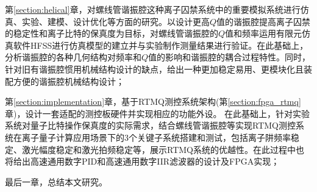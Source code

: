 第\ref{section:helical}章，对螺线管谐振腔这种离子囚禁系统中的重要模拟系统进行仿真、实验、建模、设计优化等方面的研究。以设计更高$Q$值的谐振腔提高离子囚禁的稳定性和离子比特的保真度为目标，对螺线管谐振腔的$Q$值和频率运用有限元仿真软件HFSS进行仿真模型的建立并与实验制作测量结果进行验证。在此基础上，分析谐振腔的各种几何结构对频率和$Q$值的影响和谐振腔的耦合过程特性。同时，针对旧有谐振腔惯用机械结构设计的缺点，给出一种更加稳定易用、更模块化且装配方便的谐振腔机械结构设计；

第\ref{section:implementation}章，基于RTMQ测控系统架构(第\ref{section:fpga_rtmq}章)，设计一套适配的测控板硬件并实现相应的功能外设。
在此基础上，针对实验系统对量子比特操作保真度的实际需求，结合螺线管谐振腔等实现RTMQ测控系统在离子量子计算应用场景下的3个关键子系统搭建和测试，包括离子阱频率稳定、激光幅度稳定和激光拍频稳定等，展示RTMQ系统的优越性。在此过程中也将给出高速通用数字PID和高速通用数字IIR滤波器的设计及FPGA实现；

最后一章，总结本文研究。

